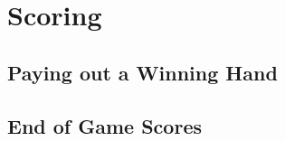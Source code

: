 \section{Scoring}\label{core:sec:scoring}

\subsection{Paying out a Winning Hand}\label{core:sec:paying-hand}



\subsection{End of Game Scores}\label{core:sec:end-scores}

